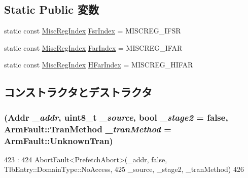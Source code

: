 \subsection*{Static Public 変数}
\begin{DoxyCompactItemize}
\item 
static const \hyperlink{namespaceArmISA_a1e522017e015d4c7efd6b2360143aa67}{MiscRegIndex} \hyperlink{classArmISA_1_1PrefetchAbort_a0fc945049ae4ebc86b2c2765b65ab5c8}{FsrIndex} = MISCREG\_\-IFSR
\item 
static const \hyperlink{namespaceArmISA_a1e522017e015d4c7efd6b2360143aa67}{MiscRegIndex} \hyperlink{classArmISA_1_1PrefetchAbort_a3c751f200a61047c7edace6f38db43aa}{FarIndex} = MISCREG\_\-IFAR
\item 
static const \hyperlink{namespaceArmISA_a1e522017e015d4c7efd6b2360143aa67}{MiscRegIndex} \hyperlink{classArmISA_1_1PrefetchAbort_adf1eccd205afd5770084542cc2295d6c}{HFarIndex} = MISCREG\_\-HIFAR
\end{DoxyCompactItemize}


\subsection{コンストラクタとデストラクタ}
\hypertarget{classArmISA_1_1PrefetchAbort_adbe1805a5aad9380631cc0402ae0667e}{
\subsubsection[{PrefetchAbort}]{ ({\bf Addr} {\em \_\-addr}, \/  uint8\_\-t {\em \_\-source}, \/  bool {\em \_\-stage2} = {\ttfamily false}, \/  {\bf ArmFault::TranMethod} {\em \_\-tranMethod} = {\ttfamily ArmFault::UnknownTran})}}
\label{classArmISA_1_1PrefetchAbort_adbe1805a5aad9380631cc0402ae0667e}



\begin{DoxyCode}
423                                                                         :
424         AbortFault<PrefetchAbort>(_addr, false, TlbEntry::DomainType::NoAccess,
425                 _source, _stage2, _tranMethod)
426     {}

\end{DoxyCode}


